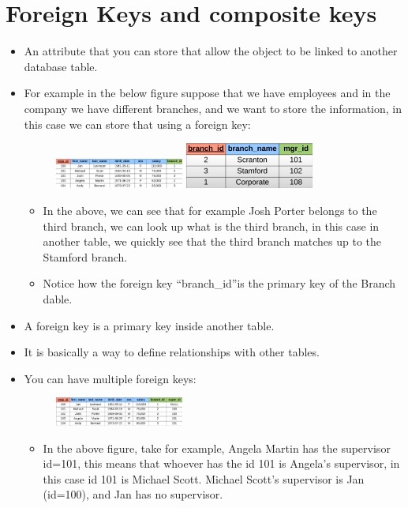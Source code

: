 \section{Foreign Keys and composite keys}
\begin{itemize}
    \item An attribute that you can store that allow the object to be linked to another database table.
    \item For example in the below figure suppose that we have employees and in the company we have different branches, and we want to store the information, in this case we can store that using a foreign key: 
        \begin{figure}[H]
            \centering
            \includegraphics[width=0.4\textwidth]{./figs/example4_1.png}
            \includegraphics[width=0.4\textwidth]{./figs/example4_2.png}
        \end{figure}
        \begin{itemize}
            \item In the above, we can see that for example Josh Porter belongs to the third branch, we can look up what is the third branch, in this case in another table, we quickly see that the third branch matches up to the Stamford branch.
            \item Notice how the foreign key ``branch\_id''is the primary key of the Branch dable.
        \end{itemize}
        
    \item A foreign key is a primary key inside another table.
    \item It is basically a way to define relationships with other tables.
    \item You can have multiple foreign keys:
        \begin{figure}[H]
            \centering
            \includegraphics[width=0.4\textwidth]{./figs/example5.png}
        \end{figure}
        \begin{itemize}
            \item In the above figure, take for example, Angela Martin has the supervisor id=101, this means that whoever has the id 101 is Angela's supervisor, in this case id 101 is Michael Scott. Michael Scott's supervisor is Jan (id=100), and Jan has no supervisor.
        \end{itemize}
    

\end{itemize}
